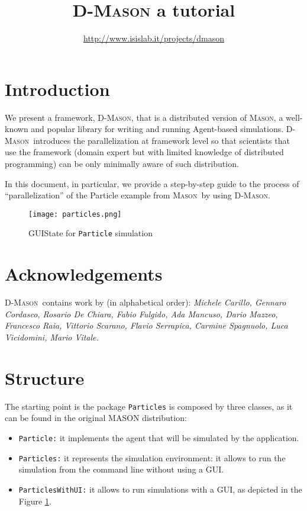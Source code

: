 \documentclass{article}
\def\ma{\textsc{Mason}}
\def\dm{\textsc{D-Mason}}
\begin{document}
\pagestyle{empty}
\sffamily
\title{\dm\: a tutorial}
\author{\url{http://www.isislab.it/projects/dmason}}
\maketitle



\section{Introduction}
We present a framework, \dm, that is a distributed version of  \ma, a well-known and popular library for writing and running Agent-based simulations. \dm\ introduces the parallelization at framework level so that scientists that use the framework (domain expert but with limited knowledge of distributed programming) can be only minimally aware of such distribution. 

In this document, in particular, we provide a step-by-step guide to the process of ``parallelization'' of the Particle example from \ma\ by using \dm.
\begin{figure}[ht]
	\centering
		\texttt{[image: particles.png]}	
		\caption{GUIState for \texttt{Particle} simulation}
	\label{fig:p01}
\end{figure}

\section{Acknowledgements}
\dm\ contains work by (in alphabetical order): \textit{Michele Carillo, Gennaro Cordasco, Rosario De Chiara, Fabio Fulgido, Ada Mancuso, Dario Mazzeo, Francesco Raia, Vittorio Scarano, Flavio Serrapica, Carmine Spagnuolo, 
Luca Vicidomini, Mario Vitale.}

\section{Structure}
The starting point is the package \texttt{Particles} is composed by three classes, as it can be found in the original MASON distribution:

\begin{itemize}
	\item \texttt{Particle:} it implements the agent that will be simulated by the application.
	\item \texttt{Particles:} it represents the simulation environment: it allows to run the simulation from the command line without using a GUI.
	\item \texttt{ParticlesWithUI:} it allows to run simulations with a GUI, as depicted in the Figure \ref{fig:p01}.
\end{itemize}
\end{document}
